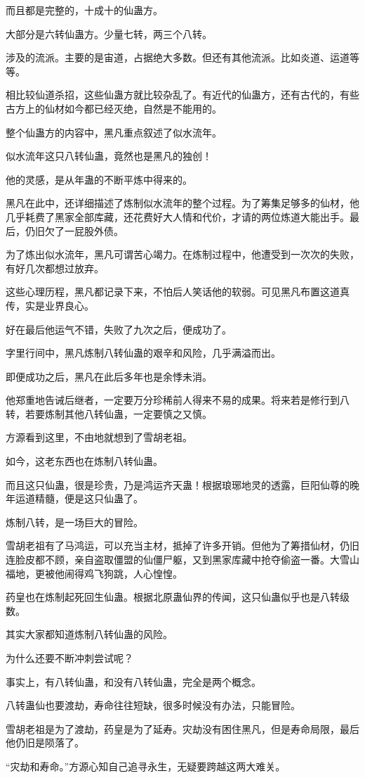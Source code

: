 \begin{this_body}
而且都是完整的，十成十的仙蛊方。

大部分是六转仙蛊方。少量七转，两三个八转。

涉及的流派。主要的是宙道，占据绝大多数。但还有其他流派。比如炎道、运道等等。

相比较仙道杀招，这些仙蛊方就比较杂乱了。有近代的仙蛊方，还有古代的，有些古方上的仙材如今都已经灭绝，自然是不能用的。

整个仙蛊方的内容中，黑凡重点叙述了似水流年。

似水流年这只八转仙蛊，竟然也是黑凡的独创！

他的灵感，是从年蛊的不断平炼中得来的。

黑凡在此中，还详细描述了炼制似水流年的整个过程。为了筹集足够多的仙材，他几乎耗费了黑家全部库藏，还花费好大人情和代价，才请的两位炼道大能出手。最后，仍旧欠了一屁股外债。

为了炼出似水流年，黑凡可谓苦心竭力。在炼制过程中，他遭受到一次次的失败，有好几次都想过放弃。

这些心理历程，黑凡都记录下来，不怕后人笑话他的软弱。可见黑凡布置这道真传，实是业界良心。

好在最后他运气不错，失败了九次之后，便成功了。

字里行间中，黑凡炼制八转仙蛊的艰辛和风险，几乎满溢而出。

即便成功之后，黑凡在此后多年也是余悸未消。

他郑重地告诫后继者，一定要万分珍稀前人得来不易的成果。将来若是修行到八转，若要炼制其他八转仙蛊，一定要慎之又慎。

方源看到这里，不由地就想到了雪胡老祖。

如今，这老东西也在炼制八转仙蛊。

而且这只仙蛊，很是珍贵，乃是鸿运齐天蛊！根据琅琊地灵的透露，巨阳仙尊的晚年运道精髓，便是这只仙蛊了。

炼制八转，是一场巨大的冒险。

雪胡老祖有了马鸿运，可以充当主材，抵掉了许多开销。但他为了筹措仙材，仍旧连脸皮都不顾，亲自盗取僵盟的仙僵尸躯，又到黑家库藏中抢夺偷盗一番。大雪山福地，更被他闹得鸡飞狗跳，人心惶惶。

药皇也在炼制起死回生仙蛊。根据北原蛊仙界的传闻，这只仙蛊似乎也是八转级数。

其实大家都知道炼制八转仙蛊的风险。

为什么还要不断冲刺尝试呢？

事实上，有八转仙蛊，和没有八转仙蛊，完全是两个概念。

八转蛊仙也要渡劫，寿命往往短缺，很多时候没有办法，只能冒险。

雪胡老祖是为了渡劫，药皇是为了延寿。灾劫没有困住黑凡，但是寿命局限，最后他仍旧是陨落了。

“灾劫和寿命。”方源心知自己追寻永生，无疑要跨越这两大难关。

\end{this_body}

